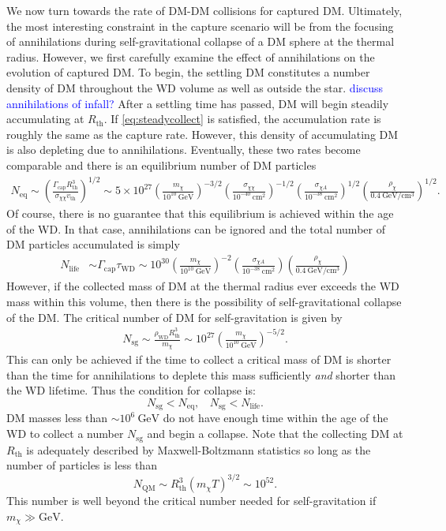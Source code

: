 \documentclass[preprintnumbers,amsmath,amssymb,prd,superscriptaddress]{revtex4}
\newcommand{\GeV}{\text{GeV}}
\newcommand{\cm}{\text{cm}}
\def\r{\right)}
\def\l{\left(}
\begin{document}
We now turn towards the rate of DM-DM collisions for captured DM. 
Ultimately, the most interesting constraint in the capture scenario will be from the focusing of annihilations during self-gravitational collapse of a DM sphere at the thermal radius.
However, we first carefully examine the effect of annihilations on the evolution of captured DM. 
To begin, the settling DM constitutes a number density of DM throughout the WD volume as well as outside the star. 
\textcolor{blue}{discuss annihilations of infall?}
After a settling time has passed, DM will begin steadily accumulating at $R_\text{th}$.
If \eqref{eq:steadycollect} is satisfied, the accumulation rate is roughly the same as the capture rate. 
However, this density of accumulating DM is also depleting due to annihilations. 
Eventually, these two rates become comparable and there is an equilibrium number of DM particles
\begin{align}
N_\text{eq} \sim \l \frac{\Gamma_\text{cap} R_\text{th}^3}{\sigma_{\chi \chi} v_\text{th}} \r^{1/2} \sim 5 \times 10^{27} \l \frac{m_\chi}{10^{10} ~\GeV} \r^{-3/2} \l \frac{\sigma_{\chi \chi}}{10^{-40} ~\cm^2} \r^{-1/2}  \l \frac{\sigma_{\chi A}}{10^{-38} ~\cm^2} \r^{1/2} \l \frac{\rho_\chi}{0.4 ~\GeV/\cm^3} \r^{1/2}.
\end{align}
Of course, there is no guarantee that this equilibrium is achieved within the age of the WD. 
In that case, annihilations can be ignored and the total number of DM particles accumulated is simply
\begin{align}
N_\text{life} &\sim \Gamma_\text{cap} \tau_\text{WD} \sim 10^{30}  \l \frac{m_\chi}{10^{10} ~\GeV} \r^{-2}  \l \frac{\sigma_{\chi A}}{10^{-38} ~\cm^2} \r \l \frac{\rho_\chi}{0.4 ~\GeV/\cm^3} \r
\end{align}
However, if the collected mass of DM at the thermal radius ever exceeds the WD mass within this volume, then there is the possibility of self-gravitational collapse of the DM.
The critical number of DM for self-gravitation is given by
\begin{align}
\label{eq:Ncore}
    N_\text{sg} \sim \frac{\rho_\text{WD} R^3_\text{th}}{m_\chi} \sim 10^{27} \l \frac{m_\chi}{10^{10} ~\GeV} \r^{-5/2}.
\end{align}
This can only be achieved if the time to collect a critical mass of DM is shorter than the time for annihilations to deplete this mass sufficiently \emph{and} shorter than the WD lifetime. 
Thus the condition for collapse is:
\begin{equation}
\label{eq:collapsecondition}
N_\text{sg} < N_\text{eq}, ~~~~ N_\text{sg} < N_\text{life}. 
\end{equation}
DM masses less than $\sim 10^{6} ~\GeV$ do not have enough time within the age of the WD to collect a number $N_\text{sg}$ and begin a collapse.
Note that the collecting DM at $R_\text{th}$ is adequately described by Maxwell-Boltzmann statistics so long as the number of particles is less than
\begin{equation}
N_\text{QM} \sim R_\text{th}^3 (m_\chi T)^{3/2} \sim 10^{52}. 
\end{equation}
This number is well beyond the critical number needed for self-gravitation if $m_\chi \gg \GeV$. 
\end{document}
